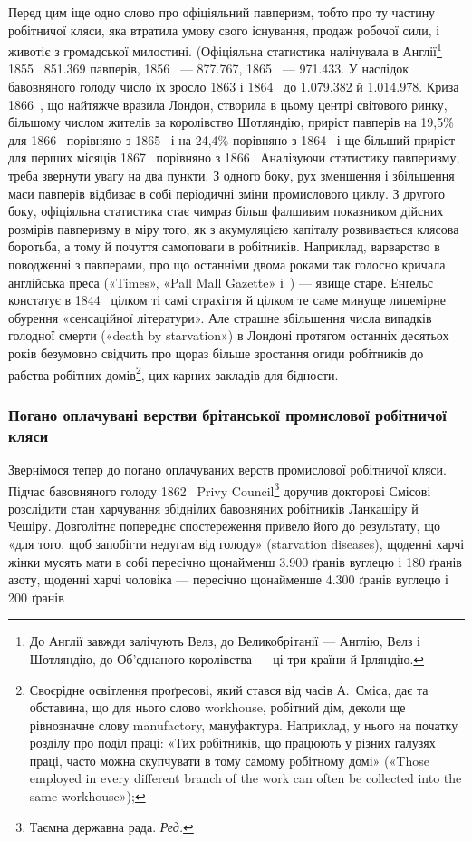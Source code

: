 
Перед цим іще одно слово про офіціяльний павперизм, тобто
про ту частину робітничої кляси, яка втратила умову свого існування,
продаж робочої сили, і животіє з громадської милостині.
(Офіціяльна статистика налічувала в Англії\footnote{
До Англії завжди залічують Велз, до Великобрітанії — Англію,
Велз і Шотляндію, до Об’єднаного королівства — ці три країни й Ірляндію.
} 1855~ \num{851.369} павперів,
1856~ — \num{877.767}, 1865~ — \num{971.433}. У наслідок бавовняного
голоду число їх зросло 1863 і 1864~ до \num{1.079.382}
й \num{1.014.978}. Криза 1866~, що найтяжче вразила Лондон, створила
в цьому центрі світового ринку, більшому числом жителів
за королівство Шотляндію, приріст павперів на 19,5\% для
1866~ порівняно з 1865~ і на 24,4\% порівняно з 1864~ і ще
більший приріст для перших місяців 1867~ порівняно з
1866~ Аналізуючи статистику павперизму, треба звернути увагу
на два пункти. З одного боку, рух зменшення і збільшення маси
павперів відбиває в собі періодичні зміни промислового циклу.
З другого боку, офіціяльна статистика стає чимраз більш фалшивим
показником дійсних розмірів павперизму в міру того,
як з акумуляцією капіталу розвивається клясова боротьба, а
тому й почуття самоповаги в робітників. Наприклад, варварство
в поводженні з павперами, про що останніми двома роками так
голосно кричала англійська преса («Times», «Pall Mall Gazette»
і~) — явище старе. Енґельс констатує в 1844~ цілком
ті самі страхіття й цілком те саме минуще лицемірне обурення
«сенсаційної літератури». Але страшне збільшення числа випадків
голодної смерти («death by starvation») в Лондоні протягом
останніх десятьох років безумовно свідчить про щораз більше зростання
огиди робітників до рабства робітних домів\footnote{
Своєрідне освітлення проґресові, який стався від часів А.~Сміса,
дає та обставина, що для нього слово workhouse, робітний дім, деколи ще
рівнозначне слову manufactory, мануфактура. Наприклад, у нього на
початку розділу про поділ праці: «Тих робітників, що працюють у різних
галузях праці, часто можна скупчувати в тому самому робітному домі»
(«Those employed in every different branch of the work can often be collected
into the same workhouse»);
}, цих карних
закладів для бідности.

\subsubsection{Погано оплачувані верстви брітанської промислової робітничої
кляси}

Звернімося тепер до погано оплачуваних верств промислової
робітничої кляси. Підчас бавовняного голоду 1862~ Privy
Council\footnote*{
Таємна державна рада. \emph{Ред.}
} доручив докторові Смісові розслідити стан харчування
збіднілих бавовняних робітників Ланкашіру й Чешіру. Довголітнє
попереднє спостереження привело його до результату, що
«для того, щоб запобігти недугам від голоду» (starvation diseases),
щоденні харчі жінки мусять мати в собі пересічно щонайменш
\num{3.900} ґранів вуглецю і 180 ґранів азоту, щоденні харчі
чоловіка — пересічно щонайменше \num{4.300} ґранів вуглецю і 200 ґранів
\parbreak{}  %
